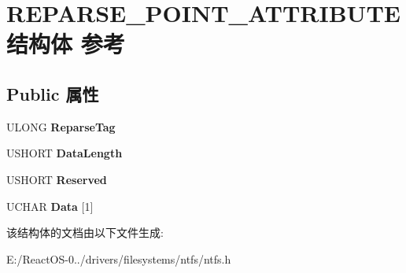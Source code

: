 \hypertarget{struct_r_e_p_a_r_s_e___p_o_i_n_t___a_t_t_r_i_b_u_t_e}{}\section{R\+E\+P\+A\+R\+S\+E\+\_\+\+P\+O\+I\+N\+T\+\_\+\+A\+T\+T\+R\+I\+B\+U\+T\+E结构体 参考}
\label{struct_r_e_p_a_r_s_e___p_o_i_n_t___a_t_t_r_i_b_u_t_e}
\subsection*{Public 属性}
\begin{DoxyCompactItemize}
\item 
\mbox{\label{struct_r_e_p_a_r_s_e___p_o_i_n_t___a_t_t_r_i_b_u_t_e_a8a950b73dc88169aef5cb07b87a4ac64}} 
U\+L\+O\+NG {\bfseries Reparse\+Tag}
\item 
\mbox{\label{struct_r_e_p_a_r_s_e___p_o_i_n_t___a_t_t_r_i_b_u_t_e_a71f48dcc332b796bc3259bd491fd9355}} 
U\+S\+H\+O\+RT {\bfseries Data\+Length}
\item 
\mbox{\label{struct_r_e_p_a_r_s_e___p_o_i_n_t___a_t_t_r_i_b_u_t_e_a427662d0da838aa292ef06832dc95c0e}} 
U\+S\+H\+O\+RT {\bfseries Reserved}
\item 
\mbox{\label{struct_r_e_p_a_r_s_e___p_o_i_n_t___a_t_t_r_i_b_u_t_e_a43cfb8471b794615b74220fd60ed7f0d}} 
U\+C\+H\+AR {\bfseries Data} \mbox{[}1\mbox{]}
\end{DoxyCompactItemize}


该结构体的文档由以下文件生成\+:\begin{DoxyCompactItemize}
\item 
E\+:/\+React\+O\+S-\/0../drivers/filesystems/ntfs/ntfs.\+h\end{DoxyCompactItemize}
